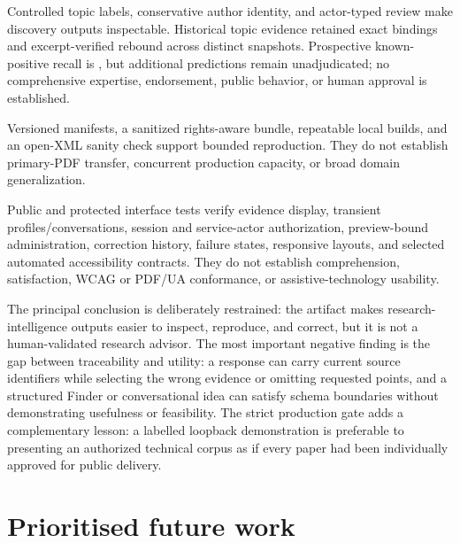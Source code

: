 \begin{description}[leftmargin=16mm,style=multiline]
  \item[RQ5] Controlled topic labels, conservative author identity, and actor-typed review make discovery outputs inspectable. Historical topic evidence retained \TopicExactBindingCount{} exact bindings and \TopicReboundBindingCount{} excerpt-verified rebound across distinct snapshots. Prospective known-positive recall is \VTwoTopicKnownPositiveRecall{}, but additional predictions remain unadjudicated; no comprehensive expertise, endorsement, public behavior, or human approval is established.
  \item[RQ6] Versioned manifests, a sanitized rights-aware bundle, repeatable local builds, and an open-XML sanity check support bounded reproduction. They do not establish primary-PDF transfer, concurrent production capacity, or broad domain generalization.
  \item[RQ7] Public and protected interface tests verify evidence display, transient profiles/conversations, session and service-actor authorization, preview-bound administration, correction history, failure states, responsive layouts, and selected automated accessibility contracts. They do not establish comprehension, satisfaction, WCAG or PDF/UA conformance, or assistive-technology usability.
\end{description}

The principal conclusion is deliberately restrained: the artifact makes research-intelligence outputs easier to inspect, reproduce, and correct, but it is not a human-validated research advisor. The most important negative finding is the gap between traceability and utility: a response can carry current source identifiers while selecting the wrong evidence or omitting requested points, and a structured Finder or conversational idea can satisfy schema boundaries without demonstrating usefulness or feasibility. The strict production gate adds a complementary lesson: a labelled loopback demonstration is preferable to presenting an authorized technical corpus as if every paper had been individually approved for public delivery.

\section{Prioritised future work}

